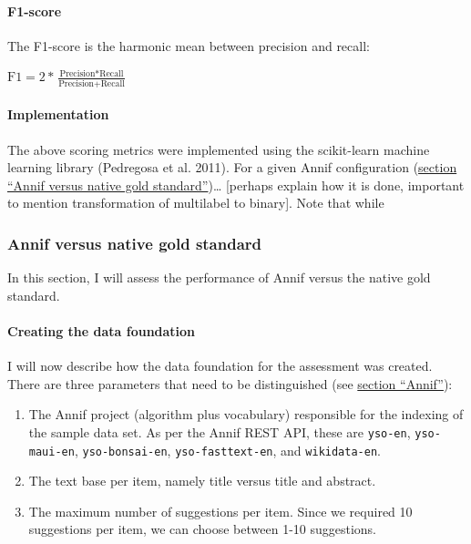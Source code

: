 \hypertarget{f1-score}{%
\paragraph{F1-score}\label{f1-score}}

The F1-score is the harmonic mean between precision and recall:

\begin{center} 
$\text{F1} = \displaystyle 2 * \frac{\text{Precision} * \text{Recall}}{\text{Precision} + \text{Recall}}$
\end{center}

\hypertarget{implementation-1}{%
\paragraph{Implementation}\label{implementation-1}}

The above scoring metrics were implemented using the scikit-learn
machine learning library (Pedregosa et al. 2011). For a given Annif
configuration
(\protect\hyperlink{annif-versus-native-gold-standard}{section ``Annif
versus native gold standard''})\ldots{} {[}perhaps explain how it is
done, important to mention transformation of multilabel to binary{]}.
Note that while

\hypertarget{annif-versus-native-gold-standard}{%
\subsubsection{Annif versus native gold
standard}\label{annif-versus-native-gold-standard}}

In this section, I will assess the performance of Annif versus the
native gold standard.

\hypertarget{creating-the-data-foundation}{%
\paragraph{Creating the data
foundation}\label{creating-the-data-foundation}}

I will now describe how the data foundation for the assessment was
created. There are three parameters that need to be distinguished (see
\protect\hyperlink{annif}{section ``Annif''}):

\begin{enumerate}
\def\labelenumi{\arabic{enumi}.}
\tightlist
\item
  The Annif project (algorithm plus vocabulary) responsible for the
  indexing of the sample data set. As per the Annif REST API, these are
  \texttt{yso-en}, \texttt{yso-maui-en}, \texttt{yso-bonsai-en},
  \texttt{yso-fasttext-en}, and \texttt{wikidata-en}.
\item
  The text base per item, namely title versus title and abstract.
\item
  The maximum number of suggestions per item. Since we required 10
  suggestions per item, we can choose between 1-10 suggestions.
\end{enumerate}

